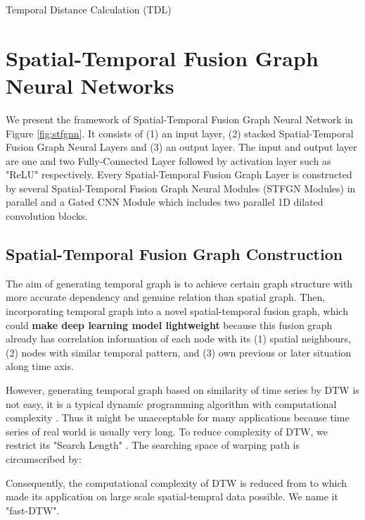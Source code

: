 \documentclass[letterpaper]{article} \usepackage{aaai21}  \usepackage{times}  \usepackage{helvet} \usepackage{courier}  \usepackage[hyphens]{url}  \usepackage{graphicx} \urlstyle{rm} \def\UrlFont{\rm}  \usepackage{natbib}  \usepackage{caption} \frenchspacing  \setlength{\pdfpagewidth}{8.5in}  \setlength{\pdfpageheight}{11in}  \usepackage{multirow}
\begin{document}
\begin{algorithm}
	\small{
		\caption{\label{alg:tdl} Temporal Distance Calculation (TDL)}
		\For{}{
			\For{}{
				\;
				\lIf{}{}
				\lElseIf{}{}
				\lElseIf{}{}
				\lElseIf{}{}
				\lElseIf{}{}
				\lElse{}
			}
		}
		\Return 
	}
\end{algorithm}

\section{Spatial-Temporal Fusion Graph Neural Networks}
We present the framework of Spatial-Temporal Fusion Graph Neural Network in Figure \ref{fig:stfgnn}. It consists of (1) an input layer, (2) stacked Spatial-Temporal Fusion Graph Neural Layers and (3) an output layer. The input and output layer are one and two Fully-Connected Layer followed by activation layer such as "ReLU" \cite{nair2010rectified} respectively. Every Spatial-Temporal Fusion Graph Layer is constructed by several Spatial-Temporal Fusion Graph Neural Modules (STFGN Modules) in parallel and a Gated CNN Module which includes two parallel 1D dilated convolution blocks. 

\subsection{Spatial-Temporal Fusion Graph Construction}
The aim of generating temporal graph is to achieve certain graph structure with more accurate dependency and genuine relation than spatial graph. Then, incorporating temporal graph into a novel spatial-temporal fusion graph, which could \textbf{make deep learning model lightweight} because this fusion graph already has correlation information of each node with its (1) spatial neighbours, (2) nodes with similar temporal pattern, and (3) own previous or later situation along time axis.

However, generating temporal graph based on similarity of time series by DTW is not easy, it is a typical dynamic programming algorithm with computational complexity . Thus it might be unacceptable for many applications because time series of real world is usually very long. To reduce complexity of DTW, we restrict its "Search Length" . The searching space of warping path is circumscribed by:

Consequently, the computational complexity of DTW is reduced from  to  which made its application on large scale spatial-tempral data possible. We name it "fast-DTW".
\end{document}
